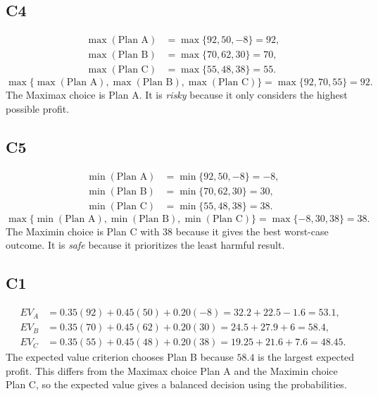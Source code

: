 \begin{ExamProblems}
		\subsection*{C4}
		\[
		\begin{aligned}
		\max(\text{Plan A}) &= \max\{92,50,-8\} = 92,\\
		\max(\text{Plan B}) &= \max\{70,62,30\} = 70,\\
		\max(\text{Plan C}) &= \max\{55,48,38\} = 55.
		\end{aligned}
		\]
		\[
		\max\{\max(\text{Plan A}), \max(\text{Plan B}), \max(\text{Plan C})\}
		= \max\{92, 70, 55\}
		= 92.
		\]
		The Maximax choice is Plan A. It is \emph{risky} because it only considers the highest possible profit.

		\subsection*{C5}
		\[
		\begin{aligned}
		\min(\text{Plan A}) &= \min\{92,50,-8\} = -8,\\
		\min(\text{Plan B}) &= \min\{70,62,30\} = 30,\\
		\min(\text{Plan C}) &= \min\{55,48,38\} = 38.
		\end{aligned}
		\]
		\[
		\max\{\min(\text{Plan A}), \min(\text{Plan B}), \min(\text{Plan C})\}
		= \max\{-8, 30, 38\}
		= 38.
		\]
		The Maximin choice is Plan C with 38 because it gives the best worst-case outcome. It is \emph{safe} because it prioritizes the least harmful result.

		\subsection*{C1}
		\[
		\begin{aligned}
		EV_A &= 0.35(92)+0.45(50)+0.20(-8)=32.2+22.5-1.6=53.1,\\
		EV_B &= 0.35(70)+0.45(62)+0.20(30)=24.5+27.9+6=58.4,\\
		EV_C &= 0.35(55)+0.45(48)+0.20(38)=19.25+21.6+7.6=48.45.
		\end{aligned}
		\]
		The expected value criterion chooses Plan B because $58.4$ is the largest expected profit. This differs from the Maximax choice Plan A and the Maximin choice Plan C, so the expected value gives a balanced decision using the probabilities.

		\item

\end{ExamProblems}
